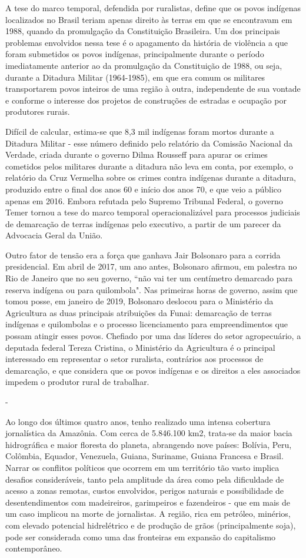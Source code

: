 A tese do marco temporal, defendida por ruralistas, define que os povos
indígenas localizados no Brasil teriam apenas direito às terras em que
se encontravam em 1988, quando da promulgação da Constituição
Brasileira. Um dos principais problemas envolvidos nessa tese é o
apagamento da história de violência a que foram submetidos os povos
indígenas, principalmente durante o período imediatamente anterior ao da
promulgação da Constituição de 1988, ou seja, durante a Ditadura Militar
(1964-1985), em que era comum os militares transportarem povos inteiros
de uma região à outra, independente de sua vontade e conforme o
interesse dos projetos de construções de estradas e ocupação por
produtores rurais.

Difícil de calcular, estima-se que 8,3 mil indígenas foram mortos
durante a Ditadura Militar - esse número definido pelo relatório da
Comissão Nacional da Verdade, criada durante o governo Dilma Rousseff
para apurar os crimes cometidos pelos militares durante a ditadura não
leva em conta, por exemplo, o relatório da Cruz Vermelha sobre os crimes
contra indígenas durante a ditadura, produzido entre o final dos anos 60
e início dos anos 70, e que veio a público apenas em 2016. Embora
refutada pelo Supremo Tribunal Federal, o governo Temer tornou a tese do
marco temporal operacionalizável para processos judiciais de demarcação
de terras indígenas pelo executivo, a partir de um parecer da Advocacia
Geral da União.

Outro fator de tensão era a força que ganhava Jair Bolsonaro para a
corrida presidencial. Em abril de 2017, um ano antes, Bolsonaro afirmou,
em palestra no Rio de Janeiro que no seu governo, ``não vai ter um
centímetro demarcado para reserva indígena ou para quilombola". Nas
primeiras horas de governo, assim que tomou posse, em janeiro de 2019,
Bolsonaro deslocou para o Ministério da Agricultura as duas principais
atribuições da Funai: demarcação de terras indígenas e quilombolas e o
processo licenciamento para empreendimentos que possam atingir esses
povos. Chefiado por uma das líderes do setor agropecuário, a deputada
federal Tereza Cristina, o Ministério da Agricultura é o principal
interessado em representar o setor ruralista, contrários aos processos
de demarcação, e que considera que os povos indígenas e os direitos a
eles associados impedem o produtor rural de trabalhar.

-

Ao longo dos últimos quatro anos, tenho realizado uma intensa cobertura
jornalística da Amazônia. Com cerca de 5.846.100 km2, trata-se da maior
bacia hidrográfica e maior floresta do planeta, abrangendo nove países:
Bolívia, Peru, Colômbia, Equador, Venezuela, Guiana, Suriname, Guiana
Francesa e Brasil. Narrar os conflitos políticos que ocorrem em um
território tão vasto implica desafios consideráveis, tanto pela
amplitude da área como pela dificuldade de acesso a zonas remotas,
custos envolvidos, perigos naturais e possibilidade de desentendimentos
com madeireiros, garimpeiros e fazendeiros - que em mais de um caso
implicou na morte de jornalistas. A região, rica em petróleo, minérios,
com elevado potencial hidrelétrico e de produção de grãos
(principalmente soja), pode ser considerada como uma das fronteiras em
expansão do capitalismo contemporâneo.

